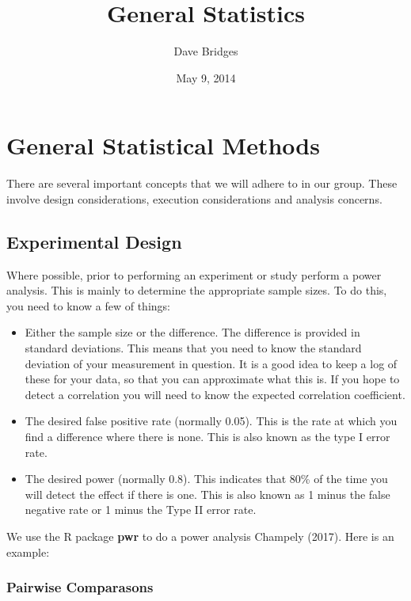 \documentclass[]{article}
\title{General Statistics}
\author{Dave Bridges}
\date{May 9, 2014}
\providecommand{\tightlist}{%
  \setlength{\itemsep}{0pt}\setlength{\parskip}{0pt}}
\begin{document}
\maketitle

{
\setcounter{tocdepth}{2}
\tableofcontents
}
\section{General Statistical Methods}\label{general-statistical-methods}

There are several important concepts that we will adhere to in our
group. These involve design considerations, execution considerations and
analysis concerns.

\subsection{Experimental Design}\label{experimental-design}

Where possible, prior to performing an experiment or study perform a
power analysis. This is mainly to determine the appropriate sample
sizes. To do this, you need to know a few of things:

\begin{itemize}
\tightlist
\item
  Either the sample size or the difference. The difference is provided
  in standard deviations. This means that you need to know the standard
  deviation of your measurement in question. It is a good idea to keep a
  log of these for your data, so that you can approximate what this is.
  If you hope to detect a correlation you will need to know the expected
  correlation coefficient.
\item
  The desired false positive rate (normally 0.05). This is the rate at
  which you find a difference where there is none. This is also known as
  the type I error rate.
\item
  The desired power (normally 0.8). This indicates that 80\% of the time
  you will detect the effect if there is one. This is also known as 1
  minus the false negative rate or 1 minus the Type II error rate.
\end{itemize}

We use the R package \textbf{pwr} to do a power analysis Champely
(2017). Here is an example:

\subsubsection{Pairwise Comparasons}\label{pairwise-comparasons}
\end{document}
